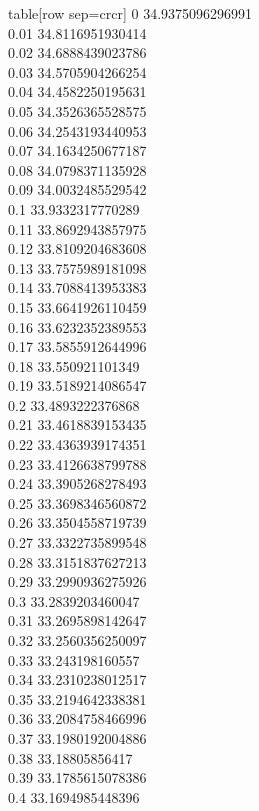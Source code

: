   table[row sep=crcr]{%
0	34.9375096296991\\
0.01	34.8116951930414\\
0.02	34.6888439023786\\
0.03	34.5705904266254\\
0.04	34.4582250195631\\
0.05	34.3526365528575\\
0.06	34.2543193440953\\
0.07	34.1634250677187\\
0.08	34.0798371135928\\
0.09	34.0032485529542\\
0.1	33.9332317770289\\
0.11	33.8692943857975\\
0.12	33.8109204683608\\
0.13	33.7575989181098\\
0.14	33.7088413953383\\
0.15	33.6641926110459\\
0.16	33.6232352389553\\
0.17	33.5855912644996\\
0.18	33.550921101349\\
0.19	33.5189214086547\\
0.2	33.4893222376868\\
0.21	33.4618839153435\\
0.22	33.4363939174351\\
0.23	33.4126638799788\\
0.24	33.3905268278493\\
0.25	33.3698346560872\\
0.26	33.3504558719739\\
0.27	33.3322735899548\\
0.28	33.3151837627213\\
0.29	33.2990936275926\\
0.3	33.2839203460047\\
0.31	33.2695898142647\\
0.32	33.2560356250097\\
0.33	33.243198160557\\
0.34	33.2310238012517\\
0.35	33.2194642338381\\
0.36	33.2084758466996\\
0.37	33.1980192004886\\
0.38	33.18805856417\\
0.39	33.1785615078386\\
0.4	33.1694985448396\\
}
